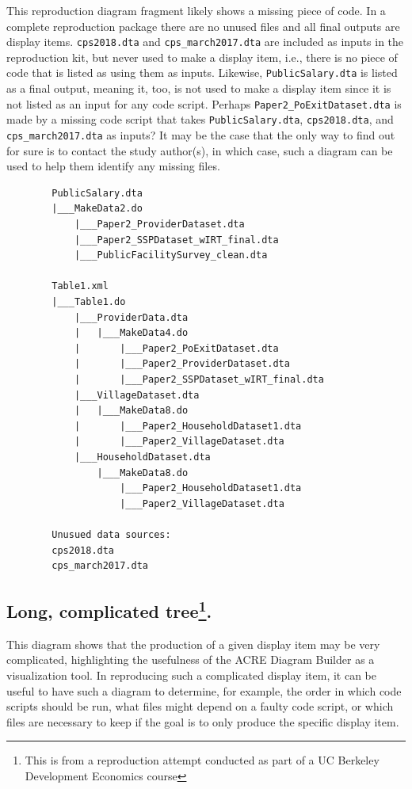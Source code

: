 \documentclass[
]{book}
\begin{document}
This reproduction diagram fragment likely shows a missing piece of code. In a complete reproduction package there are no unused files and all final outputs are display items. \texttt{cps2018.dta} and \texttt{cps\_march2017.dta} are included as inputs in the reproduction kit, but never used to make a display item, i.e., there is no piece of code that is listed as using them as inputs. Likewise, \texttt{PublicSalary.dta} is listed as a final output, meaning it, too, is not used to make a display item since it is not listed as an input for any code script. Perhaps \texttt{Paper2\_PoExitDataset.dta} is made by a missing code script that takes \texttt{PublicSalary.dta}, \texttt{cps2018.dta}, and \texttt{cps\_march2017.dta} as inputs? It may be the case that the only way to find out for sure is to contact the study author(s), in which case, such a diagram can be used to help them identify any missing files.

\begin{verbatim}
        PublicSalary.dta
        |___MakeData2.do
            |___Paper2_ProviderDataset.dta
            |___Paper2_SSPDataset_wIRT_final.dta
            |___PublicFacilitySurvey_clean.dta

        Table1.xml
        |___Table1.do
            |___ProviderData.dta
            |   |___MakeData4.do
            |       |___Paper2_PoExitDataset.dta
            |       |___Paper2_ProviderDataset.dta
            |       |___Paper2_SSPDataset_wIRT_final.dta
            |___VillageDataset.dta
            |   |___MakeData8.do
            |       |___Paper2_HouseholdDataset1.dta
            |       |___Paper2_VillageDataset.dta
            |___HouseholdDataset.dta
                |___MakeData8.do
                    |___Paper2_HouseholdDataset1.dta
                    |___Paper2_VillageDataset.dta

        Unusued data sources:
        cps2018.dta
        cps_march2017.dta  
\end{verbatim}

\hypertarget{long-complicated-tree.}{%
\subsection[Long, complicated tree.]{\texorpdfstring{Long, complicated tree\footnote{This is from a reproduction attempt conducted as part of a UC Berkeley Development Economics course}.}{Long, complicated tree.}}\label{long-complicated-tree.}}

This diagram shows that the production of a given display item may be very complicated, highlighting the usefulness of the ACRE Diagram Builder as a visualization tool. In reproducing such a complicated display item, it can be useful to have such a diagram to determine, for example, the order in which code scripts should be run, what files might depend on a faulty code script, or which files are necessary to keep if the goal is to only produce the specific display item.
\end{document}
